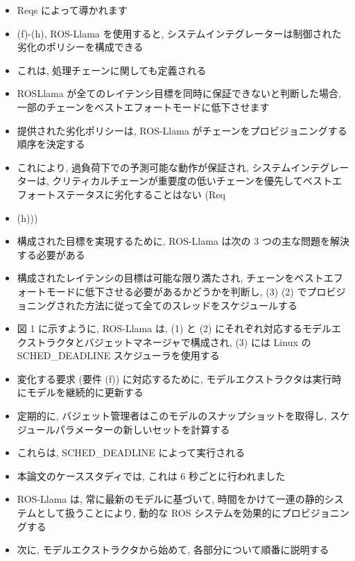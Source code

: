 \begin{frame}{}
    \begin{itemize}
        \item Reqs によって導かれます
        \item (f)-(h), ROS-Llama を使用すると, システムインテグレーターは制御された劣化のポリシーを構成できる
        \item これは, 処理チェーンに関しても定義される
        \item ROSLlama が全てのレイテンシ目標を同時に保証できないと判断した場合, 一部のチェーンをベストエフォートモードに低下させます
        \item 提供された劣化ポリシーは, ROS-Llama がチェーンをプロビジョニングする順序を決定する
        \item これにより, 過負荷下での予測可能な動作が保証され, システムインテグレーターは, クリティカルチェーンが重要度の低いチェーンを優先してベストエフォートステータスに劣化することはない (Req
        \item (h)))
    \end{itemize}
\end{frame}

\begin{frame}{}
    \begin{itemize}
        \item 構成された目標を実現するために, ROS-Llama は次の 3 つの主な問題を解決する必要がある
        \item 構成されたレイテンシの目標は可能な限り満たされ, チェーンをベストエフォートモードに低下させる必要があるかどうかを判断し, (3) (2) でプロビジョニングされた方法に従って全てのスレッドをスケジュールする
    \end{itemize}
\end{frame}

\begin{frame}{}
    \begin{itemize}
        \item 図 1 に示すように, ROS-Llama は, (1) と (2) にそれぞれ対応するモデルエクストラクタとバジェットマネージャで構成され, (3) には Linux の SCHED\_DEADLINE スケジューラを使用する
        \item 変化する要求 (要件 (f)) に対応するために, モデルエクストラクタは実行時にモデルを継続的に更新する
        \item 定期的に, バジェット管理者はこのモデルのスナップショットを取得し, スケジュールパラメーターの新しいセットを計算する
        \item これらは, SCHED\_DEADLINE によって実行される
        \item 本論文のケーススタディでは, これは 6 秒ごとに行われました
        \item ROS-Llama は, 常に最新のモデルに基づいて, 時間をかけて一連の静的システムとして扱うことにより, 動的な ROS システムを効果的にプロビジョニングする
        \item 次に, モデルエクストラクタから始めて, 各部分について順番に説明する
    \end{itemize}
\end{frame}


